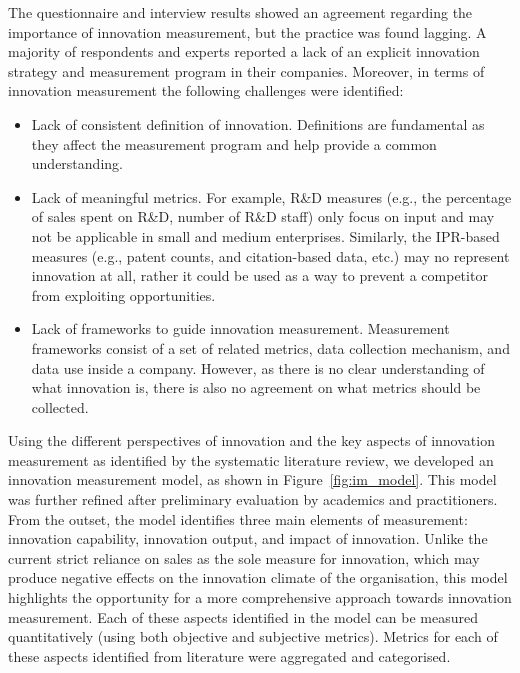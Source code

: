 \documentclass[sigconf,review]{acmart}
\begin{document}
The questionnaire and interview results showed an agreement regarding the importance of innovation measurement, but the practice was found lagging. A majority of respondents and experts reported a lack of an explicit innovation strategy and measurement program in their companies. Moreover, in terms of innovation measurement the following challenges were identified:

\begin{itemize}
    \item Lack of consistent definition of innovation. Definitions are fundamental as they affect the measurement program and help provide a common understanding.
    \item Lack of meaningful metrics. For example, R\&D measures (e.g., the percentage of sales spent on R\&D, number of R\&D staff) only focus on input and may not be applicable in small and medium enterprises. Similarly, the IPR-based measures (e.g., patent counts, and citation-based data, etc.) may no represent innovation at all, rather it could be used as a way to prevent a competitor from exploiting opportunities.
    \item Lack of frameworks to guide innovation measurement. Measurement frameworks consist of a set of related metrics, data collection mechanism, and data use inside a company. However, as there is no clear understanding of what innovation is, there is also no agreement on what metrics should be collected.
\end{itemize}

Using the different perspectives of innovation and the key aspects of innovation measurement as identified by the systematic literature review, we developed an innovation measurement model, as shown in Figure~\ref{fig:im_model}. This model was further refined after preliminary evaluation by academics and practitioners. From the outset, the model identifies three main elements of measurement: innovation capability, innovation output, and impact of innovation. Unlike the current strict reliance on sales as the sole measure for innovation, which may produce negative effects on the innovation climate of the organisation, this model highlights the opportunity for a more comprehensive approach towards innovation measurement. Each of these aspects identified in the model can be measured quantitatively (using both objective and subjective metrics). Metrics for each of these aspects identified from literature were aggregated and categorised.
\end{document}
